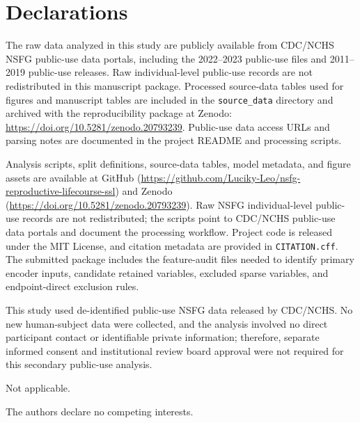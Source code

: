 \documentclass[referee,pdflatex,sn-basic,Numbered]{sn-jnl}
\begin{document}
\backmatter

\section*{Declarations}


The raw data analyzed in this study are publicly available from CDC/NCHS NSFG public-use data portals, including the 2022--2023 public-use files and 2011--2019 public-use releases. Raw individual-level public-use records are not redistributed in this manuscript package. Processed source-data tables used for figures and manuscript tables are included in the \texttt{source\_data} directory and archived with the reproducibility package at Zenodo: \url{https://doi.org/10.5281/zenodo.20793239}. Public-use data access URLs and parsing notes are documented in the project README and processing scripts.


Analysis scripts, split definitions, source-data tables, model metadata, and figure assets are available at GitHub (\url{https://github.com/Luciky-Leo/nsfg-reproductive-lifecourse-ssl}) and Zenodo (\url{https://doi.org/10.5281/zenodo.20793239}). Raw NSFG individual-level public-use records are not redistributed; the scripts point to CDC/NCHS public-use data portals and document the processing workflow. Project code is released under the MIT License, and citation metadata are provided in \texttt{CITATION.cff}. The submitted package includes the feature-audit files needed to identify primary encoder inputs, candidate retained variables, excluded sparse variables, and endpoint-direct exclusion rules.


This study used de-identified public-use NSFG data released by CDC/NCHS. No new human-subject data were collected, and the analysis involved no direct participant contact or identifiable private information; therefore, separate informed consent and institutional review board approval were not required for this secondary public-use analysis.


Not applicable.


The authors declare no competing interests.

\end{document}
